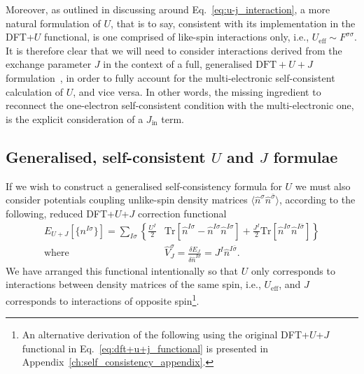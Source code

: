 Moreover, 
as outlined in discussing around Eq.~\eqref{eq:u-j_interaction}, 
a more natural formulation of $U$, 
that is to say, consistent with its implementation 
in the DFT+$U$ functional, 
is one comprised of like-spin interactions only, 
i.e., $U_\textrm{eff}\sim F^{\sigma\sigma}$.
%
It is therefore clear 
that we will need to consider interactions 
derived from the exchange parameter $J$ 
in the context of a full, generalised $\textrm{DFT}+U+J$ 
formulation~\cite{PhysRevB.79.035103,
PhysRevB.57.1505,PhysRevB.84.115108,PhysRevB.44.943,PhysRevB.60.10763,PhysRevLett.102.226401,PhysRevB.62.16392}, 
in order to fully account for the multi-electronic 
self-consistent calculation of $U$, 
and {vice versa}.
%
In other words, 
the missing ingredient to reconnect the one-electron 
self-consistent condition with the multi-electronic one, 
is the explicit consideration of a $J_\textrm{in}$ term.


\subsection{Generalised, self-consistent $U$ and $J$ formulae}

If we wish to construct a generalised 
self-consistency formula for $U$ 
we must also consider potentials 
coupling unlike-spin density matrices 
$\langle\hat{n}^\sigma \hat{n}^{\bar\sigma}\rangle$, 
according to the following, 
reduced DFT+$U$+$J$ correction 
functional
%
\begin{align}
E_{U+J}[\{n^{I\sigma}\}]=\sum_{I\sigma}\left\{\frac{U^I}{2}\right.&\left.\mbox{Tr}[\hat{n}^{I\sigma}-\hat{n}^{I\sigma}\hat{n}^{I\sigma}]+\frac{J^I}{2}\textrm{Tr}[\hat{n}^{I\sigma}\hat{n}^{I\bar\sigma}]\right\}\nonumber \\[0.5em]
\mbox{where}\qquad&
\hat{V}^\sigma_{J}=\frac{\delta E_{J}}{\delta \hat{n}^{I\sigma}}
=J^I\hat{n}^{I\bar\sigma}.
\label{eq:dft+u+j_functional2}
\end{align}
%
We have arranged this functional intentionally 
so that $U$ only corresponds to interactions 
between density matrices of the same spin, 
i.e., $U_\textrm{eff}$,  
and $J$ corresponds to interactions of opposite 
spin\footnote{An alternative derivation of the 
following using the original DFT+$U$+$J$ 
functional in Eq.~\eqref{eq:dft+u+j_functional} 
is presented in Appendix~\ref{ch:self_consistency_appendix}.}.

